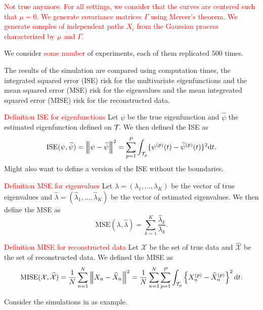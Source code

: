 \textcolor{red}{Not true anymore. For all settings, we consider that the curves are centered such that $\mu = 0$. We generate covariance matrices $\Gamma$ using Mercer's theorem. We generate samples of independent paths $X_i$ from the Gaussian process characterized by $\mu$ and $\Gamma$.}

We consider \textcolor{red}{some number} of experiments, each of them replicated $500$ times.

The results of the simulation are compared using computation times, the integrated squared error (ISE) risk for the multivariate eigenfunctions and the mean squared error (MSE) risk for the eigenvalues and the mean integreated squared error (MISE) risk for the reconstructed data.

\textcolor{red}{Definition ISE for eigenfunctions}
Let $\psi$ be the true eigenfunction and $\widehat{\psi}$ the estimated eigenfunction defined on $\mathcal{T}_{}$. We then defined the ISE as 
\begin{equation}\label{eq:ise_eigenfunctions}
    \text{ISE}(\psi, \widehat{\psi}) = \left|\!\left|\!\left|\psi - \widehat{\psi}\right|\!\right|\!\right|^2 = \sum_{p = 1}^P \int_{\mathcal{T}_{p}} \{\psi^{(p)}(t) - \widehat{\psi}^{(p)}(t)\}^2 {\rm d} t.
\end{equation}
Might also want to define a version of the ISE without the boundaries.

\textcolor{red}{Definition MSE for eigenvalues}
Let $\lambda = (\lambda_1, \dots, \lambda_K)$ be the vector of true eigenvalues and $\widehat{\lambda} = (\widehat{\lambda}_1, \dots, \widehat{\lambda}_K)$ be the vector of estimated eigenvalues. We then define the MSE as 
\begin{equation}\label{eq:mse_eigenvalues}
    \text{MSE}(\lambda, \widehat{\lambda}) = \sum_{k = 1}^K \frac{\widehat{\lambda}_k}{\lambda_k}.
\end{equation}

\textcolor{red}{Definition MISE for reconstructed data}
Let $\mathcal{X}$ be the set of true data and $\widehat{\mathcal{X}}$ be the set of reconstructed data. We defined the MISE as
\begin{equation}\label{eq:mise_reconstructed_data}
    \text{MISE}(\mathcal{X}, \widehat{\mathcal{X}}) = \frac{1}{N}\sum_{n = 1}^N \left|\!\left|\!\left|X_n - \widehat{X}_n\right|\!\right|\!\right|^2 = \frac{1}{N}\sum_{n = 1}^N \sum_{p = 1}^P \int_{\mathcal{T}_{p}} \left\{X_n^{(p)} - \widehat{X}_n^{(p)} \right\}^2 {\rm d} t.
\end{equation}

Consider the simulations in \cite{happMultivariateFunctionalPrincipal2015} as example.

